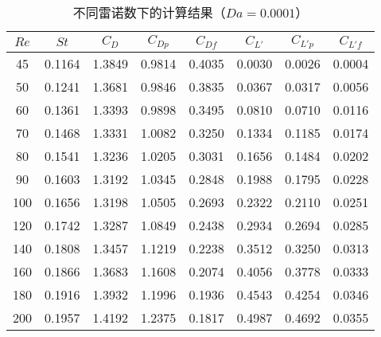 \begin{table}
	\caption{不同雷诺数下的计算结果（$Da=0.0001$）}\label{tab: results-1e-4}
	\vspace{.2em}\centering\wuhao
	\begin{tabular}{*{8}{c}}
		\toprule[1.5pt]
		$Re$ & $St$ & $C_D$ & $C_{Dp}$ & $C_{Df}$ & $C_{L'}$ & $C_{L'p}$ & $C_{L'f}$ \\
		\midrule[1pt]
		45  & 0.1164 & 1.3849 & 0.9814 & 0.4035 & 0.0030 & 0.0026 & 0.0004 \\
		50  & 0.1241 & 1.3681 & 0.9846 & 0.3835 & 0.0367 & 0.0317 & 0.0056 \\
		60  & 0.1361 & 1.3393 & 0.9898 & 0.3495 & 0.0810 & 0.0710 & 0.0116 \\
		70  & 0.1468 & 1.3331 & 1.0082 & 0.3250 & 0.1334 & 0.1185 & 0.0174 \\
		80  & 0.1541 & 1.3236 & 1.0205 & 0.3031 & 0.1656 & 0.1484 & 0.0202 \\
		90  & 0.1603 & 1.3192 & 1.0345 & 0.2848 & 0.1988 & 0.1795 & 0.0228 \\
		100 & 0.1656 & 1.3198 & 1.0505 & 0.2693 & 0.2322 & 0.2110 & 0.0251 \\
		120 & 0.1742 & 1.3287 & 1.0849 & 0.2438 & 0.2934 & 0.2694 & 0.0285 \\
		140 & 0.1808 & 1.3457 & 1.1219 & 0.2238 & 0.3512 & 0.3250 & 0.0313 \\
		160 & 0.1866 & 1.3683 & 1.1608 & 0.2074 & 0.4056 & 0.3778 & 0.0333 \\
		180 & 0.1916 & 1.3932 & 1.1996 & 0.1936 & 0.4543 & 0.4254 & 0.0346 \\
		200 & 0.1957 & 1.4192 & 1.2375 & 0.1817 & 0.4987 & 0.4692 & 0.0355 \\
		\bottomrule[1.5pt]
	\end{tabular}
\end{table}

